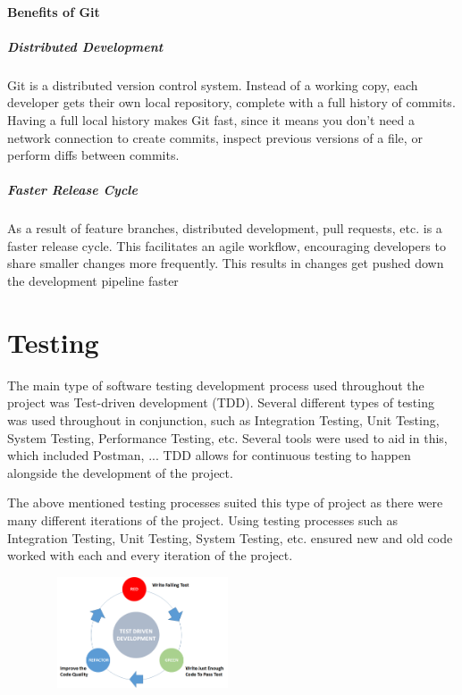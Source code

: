 \paragraph{Benefits of Git}
\subparagraph{Distributed Development}
Git is a distributed version control system. Instead of a working copy, each developer gets their own local repository, complete with a full history of commits. Having a full local history makes Git fast, since it means you don’t need a network connection to create commits, inspect previous versions of a file, or perform diffs between commits.

\subparagraph{Faster Release Cycle}
As a result of feature branches, distributed development, pull requests, etc. is a faster release cycle. This facilitates an agile workflow, encouraging developers to share smaller changes more frequently. This results in changes get pushed down the development pipeline faster

\section{Testing}
The main type of software testing development process used throughout the project was Test-driven development (TDD). Several different types of testing was used throughout in conjunction, such as Integration Testing, Unit Testing, System Testing, Performance Testing, etc. Several tools were used to aid in this, which included Postman, ... TDD allows for continuous testing to happen alongside the development of the project.
\par
\medskip
The above mentioned testing processes suited this type of project as there were many different iterations of the project. Using testing processes such as Integration Testing, Unit Testing, System Testing, etc. ensured new and old code worked with each and every iteration of the project.
\par
\medskip
\par
\medskip
\begin{center}
    \includegraphics[width=8cm,height=3.3cm,keepaspectratio]{images/tdd}
\end{center}